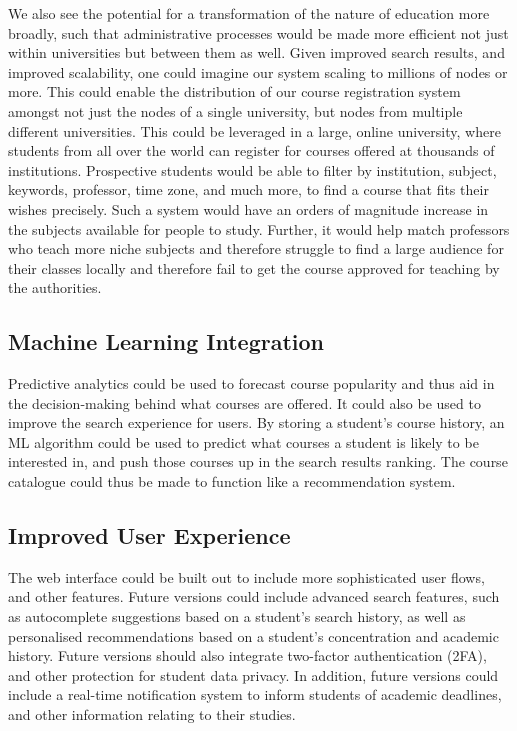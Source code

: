 \documentclass[sigplan, screen, 10pt]{acmart}
\begin{document}
We also see the potential for a transformation of the nature of education more broadly, such that administrative processes would be made more efficient not just within universities but between them as well. Given improved search results, and improved scalability, one could imagine our system scaling to millions of nodes or more. This could enable the distribution of our course registration system amongst not just the nodes of a single university, but nodes from multiple different universities. This could be leveraged in a large, online university, where students from all over the world can register for courses offered at thousands of institutions. Prospective students would be able to filter by institution, subject, keywords, professor, time zone, and much more, to find a course that fits their wishes precisely. Such a system would have an orders of magnitude increase in the subjects available for people to study. Further, it would help match professors who teach more niche subjects and therefore struggle to find a large audience for their classes locally and therefore fail to get the course approved for teaching by the authorities.

\subsection{Machine Learning Integration}
Predictive analytics could be used to forecast course popularity and thus aid in the decision-making behind what courses are offered. It could also be used to improve the search experience for users. By storing a student's course history, an ML algorithm could be used to predict what courses a student is likely to be interested in, and push those courses up in the search results ranking. The course catalogue could thus be made to function like a recommendation system.

\subsection{Improved User Experience}
The web interface could be built out to include more sophisticated user flows, and other features. Future versions could include advanced search features, such as autocomplete suggestions based on a student's search history, as well as personalised recommendations based on a student's concentration and academic history. Future versions should also integrate two-factor authentication (2FA), and other protection for student data privacy. In addition, future versions could include a real-time notification system to inform students of academic deadlines, and other information relating to their studies.
\end{document}

